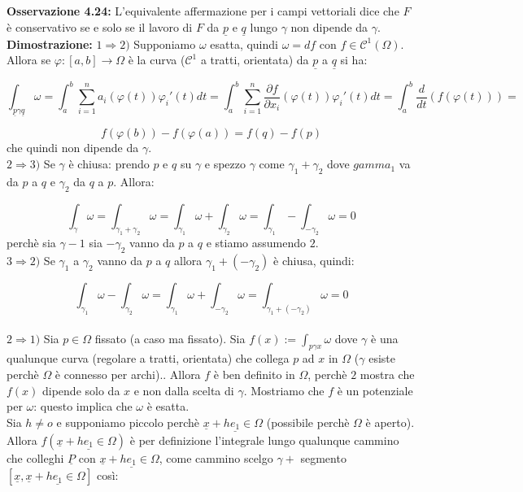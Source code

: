 \documentclass[a4paper,11pt,titlepage]{book}
\begin{document}
\textbf{Osservazione 4.24:} L'equivalente affermazione per i campi vettoriali dice che $F$ è conservativo se e solo se il lavoro di $F$ da $\underline{p}$ e $\underline{q}$ lungo $\gamma$ non dipende da $\gamma$.\\

\textbf{Dimostrazione:} $1\Rightarrow 2)$ Supponiamo $\omega$ esatta, quindi $\omega=df$ con $f\in\mathcal{C}^1(\Omega)$. Allora se $\varphi:[a,b]\to\Omega$ è la curva ($\mathcal{C}^1$ a tratti, orientata) da $\underline{p}$ a $\underline{q}$ si ha:

$$\int_{\underline{p}\gamma\underline{q}}\omega=\int_a^b\sum_{i=1}^n a_i(\varphi(t))\varphi_i'(t)dt=\int_a^b\sum_{i=1}^n \frac{\partial f}{\partial x_i}(\varphi(t))\varphi_i'(t)dt=\int_a^b\frac{d}{dt}(f(\varphi(t)))=$$

$$f(\varphi(b))-f(\varphi(a))=f(q)-f(p)$$
che quindi non dipende da $\gamma$.\\

$2\Rightarrow 3)$ Se $\gamma$ è chiusa: prendo $p$ e  $q$ su $\gamma$ e spezzo $\gamma$ come $\gamma_1+\gamma_2$ dove $gamma_1$ va da $p$ a $q$ e $\gamma_2$ da $q$ a $p$. Allora:

$$\int_\gamma\omega=\int_{\gamma_1+\gamma_2}\omega=\int_{\gamma_1}\omega+\int_{\gamma_2}\omega=\int_{\gamma_1}-\int_{-\gamma_2}\omega=0$$
perchè sia $\gamma-1$ sia $-\gamma_2$ vanno da $p$ a $q$ e stiamo assumendo $2$.\\

$3\Rightarrow 2)$ Se $\gamma_1$ a $\gamma_2$ vanno da $p$ a $q$ allora $\gamma_1+(-\gamma_2)$ è chiusa, quindi:

$$\int_{\gamma_1}\omega-\int_{\gamma_2}\omega=\int_{\gamma_1}\omega+\int_{-\gamma_2}\omega=\int_{\gamma_1+(-\gamma_2)}\omega=0$$\\

$2\Rightarrow 1)$ Sia $p\in\Omega$ fissato (a caso ma fissato). Sia $f(x):=\int_{p\gamma x}\omega$ dove $\gamma$ è una qualunque curva (regolare a tratti, orientata) che collega $p$ ad $x$ in $\Omega$ ($\gamma$ esiste perchè $\Omega$ è connesso per archi).. Allora $f$ è ben definito in $\Omega$, perchè $2$ mostra che $f(x)$ dipende solo da $x$ e non dalla scelta di $\gamma$. Mostriamo che $f$ è un potenziale per $\omega$: questo implica che $\omega$ è esatta.\\

Sia $h\ne o$ e supponiamo piccolo perchè $\underline{x}+h\underline{e_1}\in\Omega$ (possibile perchè $\Omega$ è aperto). Allora $f(\underline{x}+h\underline{e_1}\in\Omega)$ è per definizione l'integrale lungo qualunque cammino che colleghi $\underline P$ con $\underline{x}+h\underline{e_1}\in\Omega$, come cammino scelgo $\gamma+$ segmento $[\underline{x},\underline{x}+h\underline{e_1}\in\Omega]$ così:
\end{document}
